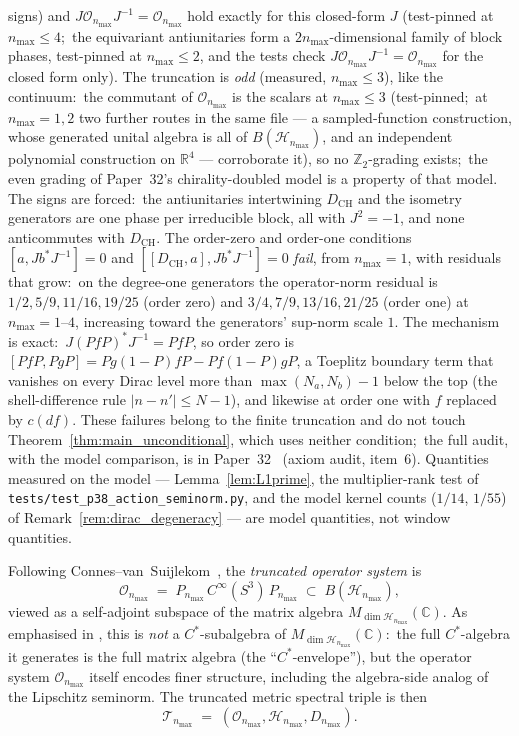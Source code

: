 \documentclass[11pt,a4paper]{article}
\theoremstyle{plain}
\theoremstyle{definition}
\newcommand{\nmax}{n_{\max}}
\newcommand{\sthree}{S^{3}}
\newcommand{\Hilb}{\mathcal{H}}
\newcommand{\Op}{\mathcal{O}}
\newcommand{\Tcal}{\mathcal{T}}
\newcommand{\C}{\mathbb{C}}
\newcommand{\Mat}{M}
\newcommand{\DCH}{D_{\mathrm{CH}}}
\begin{document}
signs) and $J\Op_{\nmax}J^{-1} = \Op_{\nmax}$ hold exactly for this
closed-form $J$ (test-pinned at $\nmax \le 4$;\ the equivariant
antiunitaries form a $2\nmax$-dimensional family of block phases,
test-pinned at $\nmax \le 2$, and the tests check
$J\Op_{\nmax}J^{-1} = \Op_{\nmax}$ for the closed form only).
The truncation is \emph{odd} (measured, $\nmax \le 3$),
like the continuum:\ the commutant of $\Op_{\nmax}$ is the scalars at
$\nmax \le 3$ (test-pinned;\ at $\nmax = 1, 2$ two further routes in
the same file --- a sampled-function construction, whose generated
unital algebra is all of $B(\Hilb_{\nmax})$, and an independent
polynomial construction on $\mathbb{R}^4$ --- corroborate it),
so no $\mathbb{Z}_2$-grading exists;\ the even grading of Paper~32's chirality-doubled model is a
property of that model.  The signs are forced:\ the antiunitaries intertwining
$\DCH$ and the isometry generators are one phase per irreducible block,
all with $J^2 = -1$, and none anticommutes with $\DCH$.  The order-zero
and order-one conditions $[a, Jb^*J^{-1}] = 0$ and
$[[\DCH, a], Jb^*J^{-1}] = 0$ \emph{fail}, from $\nmax = 1$, with
residuals that grow:\ on the degree-one generators the operator-norm
residual is $1/2, 5/9, 11/16, 19/25$ (order zero) and
$3/4, 7/9, 13/16, 21/25$ (order one) at $\nmax = 1$--$4$, increasing
toward the generators' sup-norm scale $1$.  The mechanism is exact:\
$J(PfP)^*J^{-1} = PfP$, so order zero is
$[PfP, PgP] = Pg(1-P)fP - Pf(1-P)gP$, a Toeplitz boundary term that
vanishes on every Dirac level more than $\max(N_a, N_b) - 1$ below the
top (the shell-difference rule $|n - n'| \le N - 1$), and likewise at
order one with $f$ replaced by $c(df)$.  These failures belong to the
finite truncation and do not touch
Theorem~\ref{thm:main_unconditional}, which uses neither condition;\
the full audit, with the model comparison, is in
Paper~32~\cite{paper32} (axiom audit, item~6).
Quantities measured on the model --- Lemma~\ref{lem:L1prime}, the
multiplier-rank test of \texttt{tests/test\_p38\_action\_seminorm.py},
and the model kernel counts ($1/14$, $1/55$) of
Remark~\ref{rem:dirac_degeneracy} --- are
model quantities, not window quantities.

Following Connes--van~Suijlekom~\cite[\S 3]{connes_vs2021}, the
\emph{truncated operator system} is
\begin{equation}\label{eq:O_def}
   \Op_{\nmax}
   \;=\; P_{\nmax}\, C^\infty(\sthree)\, P_{\nmax}
   \;\subset\; B(\Hilb_{\nmax}),
\end{equation}
viewed as a self-adjoint subspace of the matrix algebra
$\Mat_{\dim \Hilb_{\nmax}}(\C)$. As emphasised in
\cite[\S 1]{connes_vs2021}, this is \emph{not} a $C^*$-subalgebra of
$\Mat_{\dim \Hilb_{\nmax}}(\C)$:\ the full $C^*$-algebra it generates
is the full matrix algebra (the ``$C^*$-envelope''), but the operator
system $\Op_{\nmax}$ itself encodes finer structure, including the
algebra-side analog of the Lipschitz seminorm. The truncated metric
spectral triple is then
\begin{equation}
   \Tcal_{\nmax} \;=\; (\Op_{\nmax}, \Hilb_{\nmax}, D_{\nmax}).
\end{equation}
\end{document}
